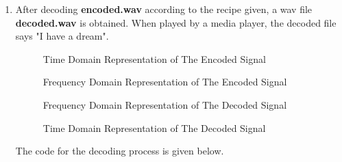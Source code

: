 \documentclass[10pt,a4paper, margin=1in]{article}
\begin{document}
\begin{enumerate}
\item After decoding \textbf{encoded.wav} according to the recipe given, a wav file \textbf{decoded.wav} is obtained.
When played by a media player, the decoded file says "I have a dream".

\begin{figure}[H]
    \centering
    
    \caption{Time Domain Representation of The Encoded Signal}
\end{figure}

\begin{figure}[H]
    \centering
    
    \caption{Frequency Domain Representation of The Encoded Signal}
\end{figure}

\begin{figure}[H]
    \centering
    
    \caption{Frequency Domain Representation of The Decoded Signal}
\end{figure}

\begin{figure}[H]
    \centering
    
    \caption{Time Domain Representation of The Decoded Signal}
\end{figure}


The code for the decoding process is given below.
\inputminted{python}{q5.py}


\end{enumerate}
\end{document}
